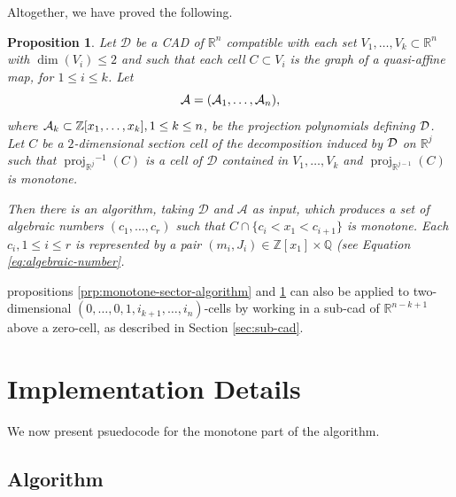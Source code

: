 \documentclass[
]{book}
\newtheorem{proposition}{Proposition}[chapter]
\theoremstyle{definition}
\theoremstyle{definition}
\theoremstyle{definition}
\theoremstyle{definition}
\theoremstyle{remark}
\begin{document}
Altogether, we have proved the following.

\begin{proposition}
\protect\hypertarget{prp:monotone-section-algorithm}{}\label{prp:monotone-section-algorithm}Let \(\mathcal{D}\) be a CAD of \(\mathbb{R}^n\) compatible with each set \(V_1,\ldots,V_k \subset \mathbb{R}^n\) with \(\dim(V_i) \le 2\) and such that each cell \(C \subset V_i\) is the graph of a quasi-affine map, for \(1\le i \le k\). Let
\[
{\cal A} = ({\cal A}_1,\ldots,{\cal A}_n),
\]
where \({\cal A}_k \subset \mathbb{Z}[x_1,\ldots,x_k], 1 \le k \le n\), be the projection polynomials defining \(\cal D\).
Let \(C\) be a \(2\)-dimensional section cell of the decomposition induced by \(\cal D\) on \(\mathbb{R}^{j}\) such that \({\operatorname{proj}_{\mathbb{R}^{j}}}^{-1}(C)\) is a cell of \(\mathcal{D}\) contained in \(V_1,\ldots,V_k\) and \({\operatorname{proj}_{\mathbb{R}^{j-1}}}(C)\) is monotone.

Then there is an algorithm, taking \(\mathcal{D}\) and \(\mathcal{A}\) as input, which produces a set of algebraic numbers \((c_1,\ldots,c_r)\) such that \(C \cap \{ c_i < x_1 < c_{i+1} \}\) is monotone. Each \(c_i, 1 \le i \le r\) is represented by a pair \((m_i, J_i) \in \mathbb{Z}[x_1] \times \mathbb{Q}\) (see Equation \eqref{eq:algebraic-number}.
\end{proposition}

\leavevmode\hypertarget{monotone-sub-cad}{}%
propositions \ref{prp:monotone-sector-algorithm} and \ref{prp:monotone-section-algorithm} can also be applied to two-dimensional \((0,\ldots,0,1,i_{k+1},\ldots,i_n)\)-cells by working in a sub-cad of \(\mathbb{R}^{n-k+1}\) above a zero-cell, as described in Section \ref{sec:sub-cad}.

\hypertarget{implementation-details}{%
\section{Implementation Details}\label{implementation-details}}

We now present psuedocode for the monotone part of the algorithm.

\hypertarget{sec:monotone-algorithm}{%
\subsection{Algorithm}\label{sec:monotone-algorithm}}
\end{document}
